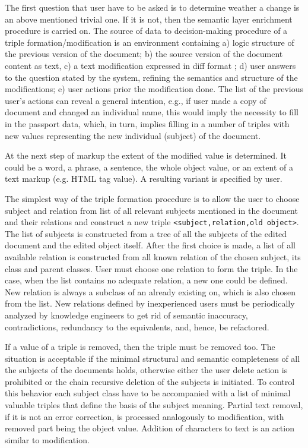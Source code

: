 \documentclass[conference]{IEEEtran}
\begin{document}
The first question that user have to be asked is to determine weather
a change is an above mentioned trivial one.  If it is not, then the
semantic layer enrichment procedure is carried on.  The source of data
to decision-making procedure of a triple formation/modification is an
environment containing a) logic structure of the previous version of
the document; b) the source version of the document content as text,
c) a text modification expressed in diff format \cite{diff}; d) user
answers to the question stated by the system, refining the semantics
and structure of the modifications; e) user actions prior the
modification done.  The list of the previous user's actions can reveal
a general intention, e.g., if user made a copy of document and changed
an individual name, this would imply the necessity to fill in the
passport data, which, in turn, implies filling in a number of triples
with new values representing the new individual (subject) of the
document.

At the next step of markup the extent of the modified value is
determined.  It could be a word, a phrase, a sentence, the whole
object value, or an extent of a text markup (e.g. HTML tag value).
A resulting variant is specified by user.

The simplest way of the triple formation procedure is to allow the user to choose subject and relation from list of all relevant subjects mentioned in the document and their relations and construct a new triple \texttt{<subject,relation,old object>}.  The list of subjects is constructed from a tree of all the subjects of the edited document and the edited object itself.  After the first choice is made, a list of all available relation is constructed from all known relation of the chosen subject, its class and parent classes.  User must choose one relation to form the triple.  In the case, when the list contains no adequate relation, a new one could be defined.  New relation is always a subclass of an already existing on, which is also chosen from the list.  New relations defined by inexperienced users must be periodically analyzed by knowledge engineers to get rid of semantic inaccuracy, contradictions, redundancy to the equivalents, and, hence, be refactored.

If a value of a triple is removed, then the triple must be removed
too.  The situation is acceptable if the minimal structural and
semantic completeness of all the subjects of the documents holds,
otherwise either the user delete action is prohibited or the chain
recursive deletion of the subjects is initiated.  To control this
behavior each subject class have to be accompanied with a list of
minimal valuable triples that define the basis of the subject meaning.
Partial text removal, if it is not an error correction, is processed
analogously to modification, with removed part being the object value.
Addition of characters to text is an action similar to modification.
\end{document}
